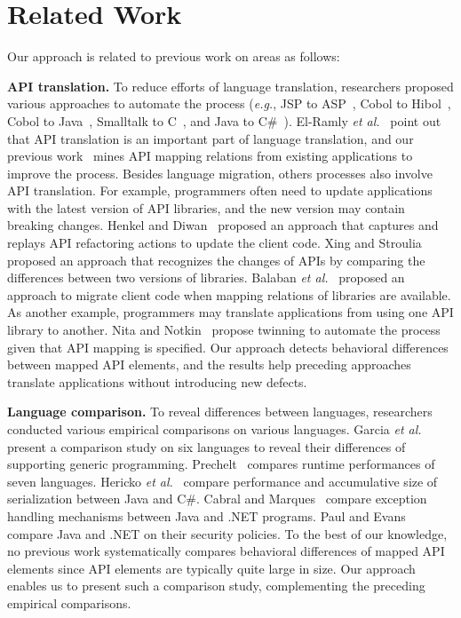 \section{Related Work}
\label{sec:related}

Our approach is related to previous work on areas as follows:

\textbf{API translation.} To reduce efforts of language translation, researchers proposed various
approaches to automate the process (\emph{e.g.}, JSP to ASP~\cite{hassan2005lightweight}, Cobol to Hibol~\cite{waters1988program}, Cobol to Java~\cite{mossienko2003automated}, Smalltalk to C~\cite{yasumatsu1995spice}, and Java to C\#~\cite{el2006experiment}). El-Ramly \emph{et al.}~\cite{el2006experiment} point out that API translation is an important part of language translation, and our previous work~\cite{zhong2010mining} mines API mapping relations from existing applications to improve the process. Besides language migration, others processes also involve API translation. For example, programmers often need to update applications with the latest version of API libraries, and the new version may contain breaking changes. Henkel and Diwan~\cite{henkel2005catchup} proposed an approach that captures and replays API refactoring actions to update the client code. Xing and Stroulia~\cite{xing2007api} proposed an approach that recognizes the changes of APIs by comparing the differences between two versions of libraries. Balaban \emph{et al.}~\cite{balaban2005refactoring} proposed an approach to migrate client code when mapping relations of libraries are available. As another example, programmers may translate applications from using one API library to another. Nita and Notkin~\cite{nita2010using} propose twinning to automate the process given that API mapping is specified. Our approach detects behavioral differences between mapped API elements, and the results help preceding approaches translate applications without introducing new defects.

\textbf{Language comparison.} To reveal differences between languages, researchers conducted various empirical comparisons on various languages. Garcia \emph{et al.}~\cite{Garcia2003} present a comparison study on six languages to reveal their differences of supporting generic programming. Prechelt~\cite{prechelt2000empirical} compares runtime performances of seven languages. Hericko \emph{et al.}~\cite{944589} compare performance and accumulative size of serialization between Java and C\#. Cabral and Marques~\cite{cabral2007exception} compare exception handling mechanisms between Java and .NET programs. Paul and Evans~\cite{paul2006comparing} compare Java and .NET on their security policies. To the best of our knowledge, no previous work systematically compares behavioral differences of mapped API elements since API elements are typically quite large in size. Our approach enables us to present such a comparison study, complementing the preceding empirical comparisons.

